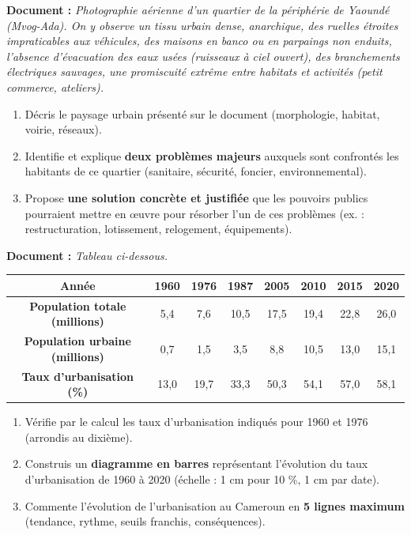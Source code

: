 \documentclass[11pt]{article}
\newcounter{popsec}
\newcounter{popsub}
\newcommand{\courssub}[1]{%
  \stepcounter{popsub}%
  \par\vspace{9pt}\noindent{\popxbold\fontsize{11.5}{13}\selectfont\color{popink}{\color{poporange}\thepopsec.\thepopsub}\hspace{6pt}#1}\par\nopagebreak\vspace{4pt}
}
\begin{document}
\courssub{Je m'entraîne}

\begin{exercice}
\textbf{Document :} \emph{Photographie aérienne d'un quartier de la périphérie de Yaoundé (Mvog-Ada). On y observe un tissu urbain dense, anarchique, des ruelles étroites impraticables aux véhicules, des maisons en banco ou en parpaings non enduits, l'absence d'évacuation des eaux usées (ruisseaux à ciel ouvert), des branchements électriques sauvages, une promiscuité extrême entre habitats et activités (petit commerce, ateliers).}
\begin{enumerate}
\item Décris le paysage urbain présenté sur le document (morphologie, habitat, voirie, réseaux).
\item Identifie et explique \textbf{deux problèmes majeurs} auxquels sont confrontés les habitants de ce quartier (sanitaire, sécurité, foncier, environnemental).
\item Propose \textbf{une solution concrète et justifiée} que les pouvoirs publics pourraient mettre en œuvre pour résorber l'un de ces problèmes (ex. : restructuration, lotissement, relogement, équipements).
\end{enumerate}
\end{exercice}

\begin{exercice}
\textbf{Document :} \emph{Tableau ci-dessous.}
\begin{center}
\begin{tabular}{|c|c|c|c|c|c|c|c|}
\hline
\textbf{Année} & 1960 & 1976 & 1987 & 2005 & 2010 & 2015 & 2020 \\
\hline
\textbf{Population totale (millions)} & 5,4 & 7,6 & 10,5 & 17,5 & 19,4 & 22,8 & 26,0 \\
\hline
\textbf{Population urbaine (millions)} & 0,7 & 1,5 & 3,5 & 8,8 & 10,5 & 13,0 & 15,1 \\
\hline
\textbf{Taux d'urbanisation (\%)} & 13,0 & 19,7 & 33,3 & 50,3 & 54,1 & 57,0 & 58,1 \\
\hline
\end{tabular}
\end{center}
\begin{enumerate}
\item Vérifie par le calcul les taux d'urbanisation indiqués pour 1960 et 1976 (arrondis au dixième).
\item Construis un \textbf{diagramme en barres} représentant l'évolution du taux d'urbanisation de 1960 à 2020 (échelle : 1 cm pour 10 \%, 1 cm par date).
\item Commente l'évolution de l'urbanisation au Cameroun en \textbf{5 lignes maximum} (tendance, rythme, seuils franchis, conséquences).
\end{enumerate}
\end{exercice}
\end{document}
